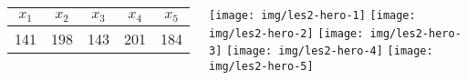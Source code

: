   \begin{columns}[c]
    \begin{center}
      \begin{tabular}{|c|c|c|c|c|}
        \hline
        $x_1$ & $x_2$ & $x_3$ & $x_4$ & $x_5$ \\
        \hline
        141 & 198 & 143 & 201 & 184 \\
        \hline
      \end{tabular}
    \end{center}
    \begin{center}
      \texttt{[image: img/les2-hero-1]}
      \texttt{[image: img/les2-hero-2]}
      \texttt{[image: img/les2-hero-3]}
      \texttt{[image: img/les2-hero-4]}
      \texttt{[image: img/les2-hero-5]}
    \end{center}
  \end{columns}
